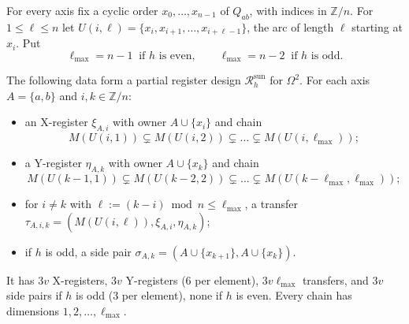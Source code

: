 For every axis fix a cyclic order $x_0,\dots,x_{n-1}$ of $Q_{ab}$, with indices in $\mathbb Z/n$. For
$1\le\ell\le n$ let $U(i,\ell)=\{x_i,x_{i+1},\dots,x_{i+\ell-1}\}$, the arc of length $\ell$ starting at
$x_i$. Put
\[
  \ell_{\max}=n-1\ \text{ if $h$ is even},\qquad \ell_{\max}=n-2\ \text{ if $h$ is odd}.
\]

\begin{proposition}\label{col:prop:sunflower}
The following data form a partial register design $\mathcal R^{\mathrm{sun}}_h$ for $\Omega^2$. For each axis
$A=\{a,b\}$ and $i,k\in\mathbb Z/n$:
\begin{itemize}
\item an X-register $\xi_{A,i}$ with owner $A\cup\{x_i\}$ and chain
  \[M(U(i,1))\subsetneq M(U(i,2))\subsetneq\dots\subsetneq M(U(i,\ell_{\max}));\]
\item a Y-register $\eta_{A,k}$ with owner $A\cup\{x_k\}$ and chain
  \[M(U(k-1,1))\subsetneq M(U(k-2,2))\subsetneq\dots\subsetneq M(U(k-\ell_{\max},\ell_{\max}));\]
\item for $i\ne k$ with $\ell:=(k-i)\bmod n\le\ell_{\max}$, a transfer
  $\tau_{A,i,k}=(M(U(i,\ell)),\xi_{A,i},\eta_{A,k})$;
\item if $h$ is odd, a side pair $\sigma_{A,k}=(A\cup\{x_{k+1}\},A\cup\{x_k\})$.
\end{itemize}
It has $3v$ X-registers, $3v$ Y-registers ($6$ per element), $3v\ell_{\max}$ transfers, and $3v$ side pairs
if $h$ is odd ($3$ per element), none if $h$ is even. Every chain has dimensions $1,2,\dots,\ell_{\max}$.
\end{proposition}

